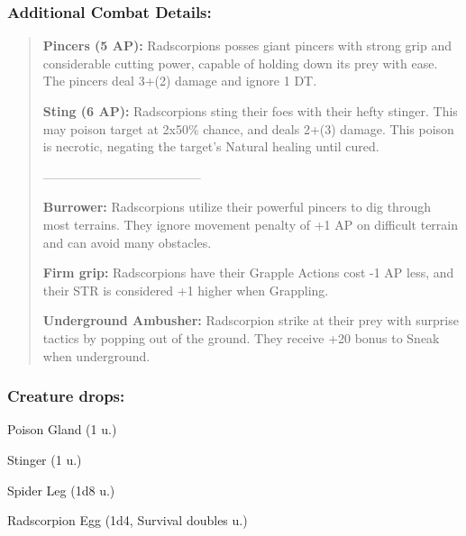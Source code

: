 \documentclass[11pt,a4paper,twocolumn]{book}
\begin{document}
	\subsubsection*{Additional Combat Details:}
	\begin{verse}
	
		\textbf{Pincers (5 AP):} Radscorpions posses giant pincers with strong grip and considerable cutting power, capable of holding down its prey with ease. The pincers deal 3+(2) damage and ignore 1 DT.
	
		\textbf{Sting (6 AP):} Radscorpions sting their foes with their hefty stinger. This may poison target at 2x50\% chance, and deals 2+(3) damage. This poison is necrotic, negating the target's Natural healing until cured.
		
--------------------------------------
		
		\textbf{Burrower:} Radscorpions utilize their powerful pincers to dig through most terrains. They ignore movement penalty of +1 AP on difficult terrain and can avoid many obstacles.
		
		\textbf{Firm grip:} Radscorpions have their Grapple Actions cost -1 AP less, and their STR is considered +1 higher when Grappling.
		
		\textbf{Underground Ambusher:} Radscorpion strike at their prey with surprise tactics by popping out of the ground. They receive +20 bonus to Sneak when underground.

%		
	\end{verse}
	
	\subsubsection*{Creature drops:}
	\begin{compactitem}
		\item Poison Gland (1 u.)
		\item Stinger (1 u.)
		\item Spider Leg (1d8 u.)
		\item Radscorpion Egg (1d4, Survival doubles u.)
	\end{compactitem}
	
\end{document}
